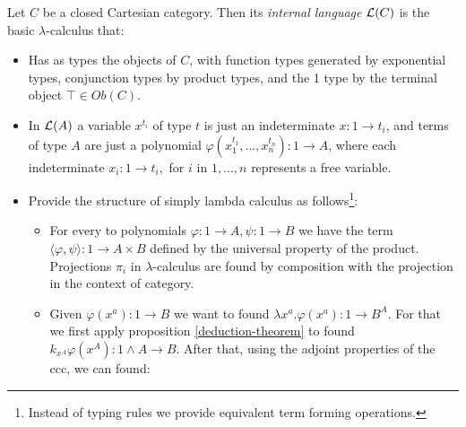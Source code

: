 \begin{definition}
\begin{definition}
  Let $C$ be a closed Cartesian category. Then its \emph{internal language} $\mathcal{L} (C)$ is the basic $\lambda$-calculus that:
  \begin{itemize}
  \item Has as types the objects of $C$, with function types generated by exponential types, conjunction types by product types, and the 1 type by the terminal object $\top \in Ob(C)$.%
  \item In $\mathcal{L}(A)$ a variable $x^{t_i}$ of type $t$ is just an indeterminate  $x:1 \to t_i$, and terms of type $A$ are just a polynomial $\varphi(x_1^{t_1},...,x_n^{t_n}):1 \to A$, where each indeterminate $x_i: 1 \to t_i,$ for $i$ in $1,...,n$ represents a free variable.
  \item Provide the structure of simply lambda calculus as follows\footnote{Instead of typing rules we provide equivalent term forming operations.}:
    \begin{itemize}
    \item For every to polynomials $\varphi: 1 \to A, \psi: 1\to B$ we have the term $\langle \varphi, \psi \rangle: 1 \to A\times B$ defined by the universal property of the product. Projections $\pi_i$ in $\lambda$-calculus are found by composition with the projection in the context of category.
    \item Given $\varphi(x^a):1 \to B$ we want to found $\lambda x^a.\varphi(x^a): 1 \to B^A$.  For that we first apply proposition \ref{deduction-theorem} to found $k_{x^A}\varphi(x^A): 1 \land A \to B$. After that, using the adjoint properties of the ccc, we can found:

\end{itemize}
\end{itemize}
\end{definition}
\end{definition}
